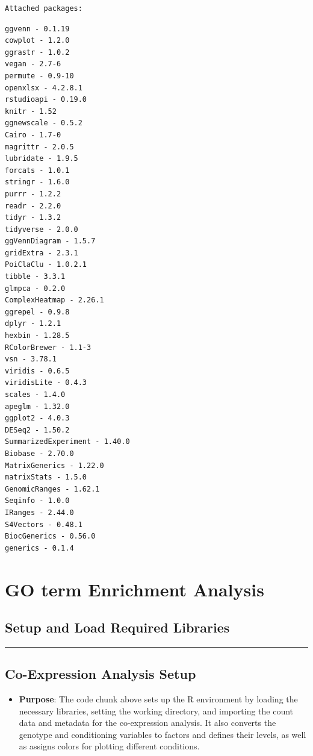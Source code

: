 \documentclass[
  11pt,
]{article}
\providecommand{\tightlist}{%
  \setlength{\itemsep}{0pt}\setlength{\parskip}{0pt}}\usepackage{longtable,booktabs,array}
\begin{document}
\begin{verbatim}
Attached packages:
\end{verbatim}

\begin{verbatim}
ggvenn - 0.1.19 
cowplot - 1.2.0 
ggrastr - 1.0.2 
vegan - 2.7-6 
permute - 0.9-10 
openxlsx - 4.2.8.1 
rstudioapi - 0.19.0 
knitr - 1.52 
ggnewscale - 0.5.2 
Cairo - 1.7-0 
magrittr - 2.0.5 
lubridate - 1.9.5 
forcats - 1.0.1 
stringr - 1.6.0 
purrr - 1.2.2 
readr - 2.2.0 
tidyr - 1.3.2 
tidyverse - 2.0.0 
ggVennDiagram - 1.5.7 
gridExtra - 2.3.1 
PoiClaClu - 1.0.2.1 
tibble - 3.3.1 
glmpca - 0.2.0 
ComplexHeatmap - 2.26.1 
ggrepel - 0.9.8 
dplyr - 1.2.1 
hexbin - 1.28.5 
RColorBrewer - 1.1-3 
vsn - 3.78.1 
viridis - 0.6.5 
viridisLite - 0.4.3 
scales - 1.4.0 
apeglm - 1.32.0 
ggplot2 - 4.0.3 
DESeq2 - 1.50.2 
SummarizedExperiment - 1.40.0 
Biobase - 2.70.0 
MatrixGenerics - 1.22.0 
matrixStats - 1.5.0 
GenomicRanges - 1.62.1 
Seqinfo - 1.0.0 
IRanges - 2.44.0 
S4Vectors - 0.48.1 
BiocGenerics - 0.56.0 
generics - 0.1.4 
\end{verbatim}

\section{GO term Enrichment Analysis}\label{go-term-enrichment-analysis}

\subsection{Setup and Load Required
Libraries}\label{setup-and-load-required-libraries}

\begin{center}\rule{0.5\linewidth}{0.5pt}\end{center}

\subsection{Co-Expression Analysis
Setup}\label{co-expression-analysis-setup}

\begin{itemize}
\tightlist
\item
  \textbf{Purpose}: The code chunk above sets up the R environment by
  loading the necessary libraries, setting the working directory, and
  importing the count data and metadata for the co-expression analysis.
  It also converts the genotype and conditioning variables to factors
  and defines their levels, as well as assigns colors for plotting
  different conditions.
\end{itemize}
\end{document}

